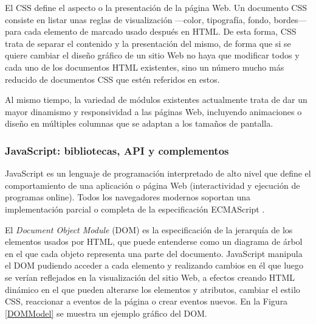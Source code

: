 El CSS define el aspecto o la presentación de la página Web. Un documento CSS consiste en listar unas reglas de visualización —color, tipografía, fondo, bordes— para cada elemento de marcado usado después en HTML. De esta forma, CSS trata de separar el contenido y la presentación del mismo, de forma que si se quiere cambiar el diseño gráfico de un sitio Web no haya que modificar todos y cada uno de los documentos HTML existentes, sino un número mucho más reducido de documentos CSS que estén referidos en estos.

Al mismo tiempo, la variedad de módulos existentes actualmente trata de dar un mayor dinamismo y responsividad a las páginas Web, incluyendo animaciones o diseño en múltiples columnas que se adaptan a los tamaños de pantalla.

\subsubsection{JavaScript: bibliotecas, API y complementos}
JavaScript es un lenguaje de programación interpretado de alto nivel que define el comportamiento de una aplicación o página Web (interactividad y ejecución de programas online). Todos los navegadores modernos soportan una implementación parcial o completa de la especificación ECMAScript \cite{ECMAScript2016}.

El \emph{Document Object Module} (\acrshort{DOM}) es la especificación de la jerarquía de los elementos usados por HTML, que puede entenderse como un diagrama de árbol en el que cada objeto representa una parte del documento. JavaScript manipula el DOM pudiendo acceder a cada elemento y realizando cambios en él que luego se verían reflejados en la visualización del sitio Web, a efectos creando HTML dinámico en el que pueden alterarse los elementos y atributos, cambiar el estilo CSS, reaccionar a eventos de la página o crear eventos nuevos. En la Figura \ref{DOMModel} se muestra un ejemplo gráfico del DOM.

